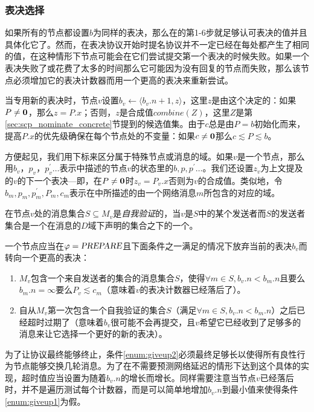 \subsubsection{表决选择}

如果所有的节点都设置$b$为同样的表决，那么在的第1-6步就足够认可表决的值并且具体化它了。然而，在表决协议开始时提名协议并不一定已经在每处都产生了相同的值，在这种情形下节点可能会在它们尝试提交第一个表决的时候失败。如果一个表决失败了或花费了太多的时间那么它可能因为没有回复的节点而失败，那么该节点必须增加它的表决计数器而用一个更高的表决来重新尝试。

当专用新的表决时，节点$v$设置$b_v\leftarrow \langle b_v.n+1,z\rangle$，这里$z$是由这个决定的：如果$P\neq {\bm 0}$，那么$z=P.x$；否则，$z$是合成值$combine(Z)$，这里$Z$是第\ref{sec:scp_nominate_concrete}节提到的候选值集。由于$c$总是由$P=b$初始化而来，提高$P.x$的优先级确保在每个节点处的不变量：如果$c\neq {\bm 0}$那么$c\lesssim P\lesssim b$。

方便起见，我们用下标来区分属于特殊节点或消息的域。如果$v$是一个节点，那么用$b_v$，$p_v$，$p_v^{\prime}\ldots$表示中描述的节点$v$的状态里的$b,p,p^{\prime}\ldots$。我们还设置$z_v$为上文提及的$v$的下一个表决---即，在$P\neq {\bm 0}$时$z_v=P_v.x$否则为$v$的合成值。类似地，令$b_m,p_m,p^{\prime}_m,P_m,c_m$表示在中所描述的由一个网络消息$m$所包含的对应的域。

\begin{definition}[自我验证]
	在节点$v$处的消息集合$S\subseteq M_v$是\textit{自我验证}的，当$v$是$S$中的某个发送者而$S$的发送者集合是一个在消息的$D$域下声明的{\quorum}集合之下的一个{\quorum}。
\end{definition}

一个节点应当在$\varphi=\textsl{PREPARE}$且下面条件之一满足的情况下放弃当前的表决$b_v$而转向一个更高的表决：

\begin{enumerate}
	\item\label{enum:giveup1} $M_v$包含一个来自发送者的{\vblock}集合的消息集合$S$，使得$\forall m\in S,b_v.n<b_m.n$且要么$b_m.n=\infty$要么$P_v\lesssim c_m$（意味着$v$的表决计数器已经落后了）。
	\item\label{enum:giveup2} 自从$M_v$第一次包含一个自我验证的集合$S$（满足$\forall m\in S,b_v.n<b_m.n$）之后已经超时过期了（意味着$b_v$很可能不会再提交，且$v$希望它已经收到了足够多的消息来让它选择一个更好的新的表决）。
\end{enumerate}

为了让协议最终能够终止，条件\ref{enum:giveup2}必须最终足够长以使得所有良性行为节点能够交换几轮消息。为了在不需要预测网络延迟的情形下达到这个具体的实现，超时值应当设置为随着$b_v.n$的增长而增长。同样需要注意当节点$v$已经落后时，并不是遍历测试每个计数器，而是可以简单地增加$b_v.n$到最小值来使得条件\ref{enum:giveup1}为假。